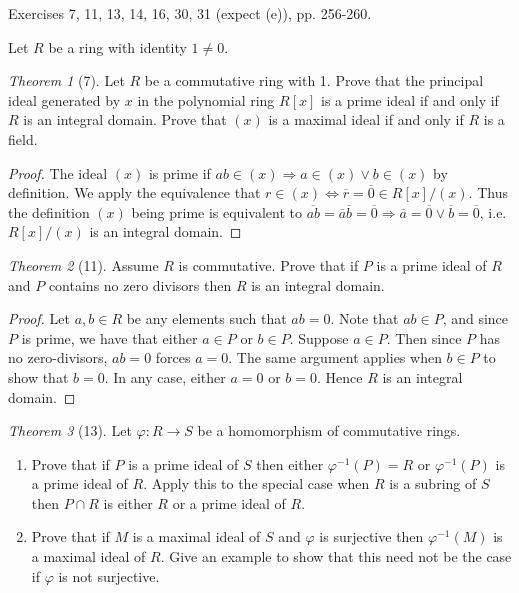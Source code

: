 \documentclass[12pt]{article}
\theoremstyle{remark}
\theoremstyle{named}
\newtheorem*{theorem}{Theorem}
\begin{document}
Exercises 7, 11, 13, 14, 16, 30, 31 (expect (e)), pp. 256-260.

Let \(R\) be a ring with identity \(1 \neq 0\).

\begin{theorem}[7]
    Let \(R\) be a commutative ring with 1. Prove that the principal ideal generated by \(x\) in the polynomial ring \(R[x]\) is a prime ideal if and only if \(R\) is an integral domain. Prove that \((x)\) is a maximal ideal if and only if \(R\) is a field.
\end{theorem}

\begin{proof}
    The ideal \((x)\) is prime if \(ab \in (x) \Rightarrow a \in (x) \lor b \in (x)\) by definition. We apply the equivalence that \(r \in (x) \iff \overline{r} = \overline{0} \in R[x] / (x)\). Thus the definition \((x)\) being prime is equivalent to \(\overline{ab} = \overline{a} \overline{b} = \overline{0} \Rightarrow \overline{a} = \overline{0} \lor \overline{b} = \overline{0}\), i.e. \(R[x]/(x)\) is an integral domain.
\end{proof}

\begin{theorem}[11]
    Assume \(R\) is commutative. Prove that if \(P\) is a prime ideal of \(R\) and \(P\) contains no zero divisors then \(R\) is an integral domain.
\end{theorem}

\begin{proof}
    Let \(a, b \in R\) be any elements such that \(ab = 0\). Note that \(ab \in P\), and since \(P\) is prime, we have that either \(a \in P\) or \(b \in P\). Suppose \(a \in P\). Then since \(P\) has no zero-divisors, \(ab = 0\) forces \(a = 0\). The same argument applies when \(b \in P\) to show that \(b = 0\). In any case, either \(a = 0\) or \(b = 0\). Hence \(R\) is an integral domain.
\end{proof} 

\begin{theorem}[13]
    Let \(\varphi : R \to S\) be a homomorphism of commutative rings. 
    \begin{enumerate}
        \item Prove that if \(P\) is a prime ideal of \(S\) then either \(\varphi^{-1}(P) = R\) or \(\varphi^{-1}(P)\) is a prime ideal of \(R\). Apply this to the special case when \(R\) is a subring of \(S\) then \(P \cap R\) is either \(R\) or a prime ideal of \(R\).
        \item Prove that if \(M\) is a maximal ideal of \(S\) and \(\varphi\) is surjective then \(\varphi^{-1}(M)\) is a maximal ideal of \(R\). Give an example to show that this need not be the case if \(\varphi\) is not surjective.
    \end{enumerate}
\end{theorem}
\end{document}
